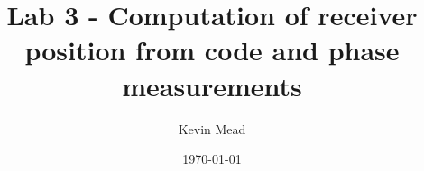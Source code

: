%
%
%
%
%
%
%
%
%
%
%
%
%
%
%
%
%
%
%
%
%
%
%
%
%
%
%
%
%
%
%
%
%
%
%
%
%
%
%
%
%
%
%
%
%
 \title{Lab 3 - Computation of receiver position from code and phase measurements} 
\author{Kevin Mead}

\date{\today} 
\maketitle 







 
